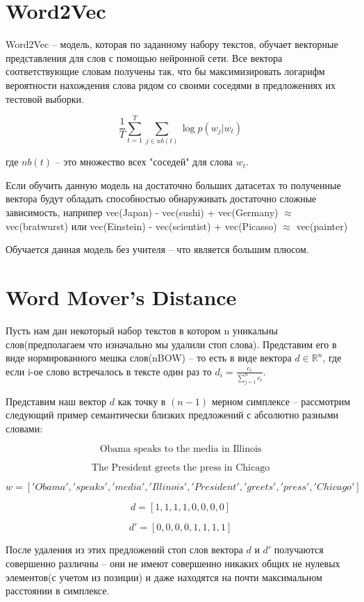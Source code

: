 \documentclass[10pt,reqno]{amsart}
\theoremstyle{definition}
\theoremstyle{remark}
\newcommand{\lfrac} [2] {\displaystyle \frac{#1}{#2}}
\begin{document}
\section{Word2Vec}

Word2Vec -- модель, которая по заданному набору текстов, обучает векторные представления для слов с помощью нейронной сети. Все вектора соответствующие словам получены так, что бы максимизировать логарифм вероятности нахождения слова рядом со своими соседями в предложениях их тестовой выборки.

$$
\lfrac{1}{T} \sum_{t = 1}^{T} \sum_{j \in nb(t)} \log{p(w_j | w_t)}
$$

где $nb(t)$ -- это множество всех "соседей" для слова $w_t$.


Если обучить данную модель на достаточно больших датасетах то полученные вектора будут обладать способностью обнаруживать достаточно сложные зависимость, наприпер vec(Japan) - vec(sushi) + vec(Germany) $\approx$ vec(bratwurst) или vec(Einstein) - vec(scientist) + vec(Picasso) $\approx$ vec(painter)

Обучается данная модель без учителя -- что является большим плюсом.

\section{Word Mover’s Distance}

Пусть нам дан некоторый набор текстов в котором n уникальны слов(предполагаем что изначально мы удалили стоп слова). Представим его в виде нормированного мешка слов(nBOW) -- то есть в виде вектора $d \in \mathbb{R}^{n}$, где если i-ое слово встречалось в тексте один раз то  $d_i = \lfrac{c_i}{\sum^{n}_{j = 1}c_i}$.

Представим наш вектор $d$ как точку в $(n - 1)$ мерном симплексе -- рассмотрим следующий пример семантически близких предложений с абсолютно разными словами:

$$
\text{Obama speaks to the media in Illinois}
$$

$$
\text{The President greets the press in Chicago}
$$

$$
w = ['Obama', 'speaks', 'media', 'Illinois', 'President', 'greets', 'press', 'Chicago']
$$

$$
d = [1,1,1,1,0,0,0,0]
$$

$$
d' = [0,0,0,0,1,1,1,1]
$$

После удаления из этих предложений стоп слов вектора $d$ и $d'$ получаются совершенно различны -- они не имеют совершенно никаких общих не нулевых элементов(с учетом из позиции) и даже находятся на почти максимальном расстоянии в симплексе.
\end{document}
